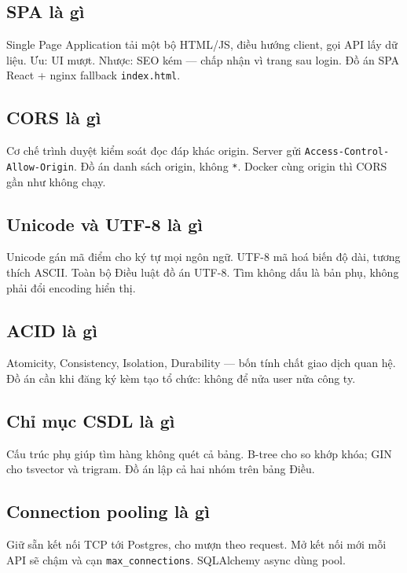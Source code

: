 \subsection{SPA là gì}

Single Page Application tải một bộ HTML/JS, điều hướng client, gọi API lấy dữ
liệu. Ưu: UI mượt. Nhược: SEO kém --- chấp nhận vì trang sau login. Đồ án SPA
React + nginx fallback \texttt{index.html}.

\subsection{CORS là gì}

Cơ chế trình duyệt kiểm soát đọc đáp khác origin. Server gửi
\texttt{Access-Control-Allow-Origin}. Đồ án danh sách origin, không \texttt{*}.
Docker cùng origin thì CORS gần như không chạy.

\subsection{Unicode và UTF-8 là gì}

Unicode gán mã điểm cho ký tự mọi ngôn ngữ. UTF-8 mã hoá biến độ dài, tương
thích ASCII. Toàn bộ Điều luật đồ án UTF-8. Tìm không dấu là bản phụ, không phải
đổi encoding hiển thị.

\subsection{ACID là gì}

Atomicity, Consistency, Isolation, Durability --- bốn tính chất giao dịch quan
hệ. Đồ án cần khi đăng ký kèm tạo tổ chức: không để nửa user nửa công ty.

\subsection{Chỉ mục CSDL là gì}

Cấu trúc phụ giúp tìm hàng không quét cả bảng. B-tree cho so khớp khóa; GIN cho
tsvector và trigram. Đồ án lập cả hai nhóm trên bảng Điều.

\subsection{Connection pooling là gì}

Giữ sẵn kết nối TCP tới Postgres, cho mượn theo request. Mở kết nối mới mỗi API
sẽ chậm và cạn \texttt{max\_connections}. SQLAlchemy async dùng pool.

